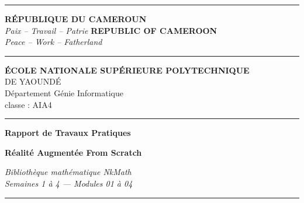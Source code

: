 \documentclass[12pt,a4paper]{report}
\begin{document}
\begin{titlepage}
    \begin{center}
        \vspace*{0.5cm}

        \textcolor{titlecolor}{\rule{\linewidth}{2pt}}
        \vspace{0.3cm}

        {\Large\textbf{RÉPUBLIQUE DU CAMEROUN}\\
        \textit{Paix -- Travail -- Patrie}}
        \hfill
        {\Large\textbf{REPUBLIC OF CAMEROON}\\
        \textit{Peace -- Work -- Fatherland}}

        \vspace{0.5cm}
        \textcolor{titlecolor}{\rule{\linewidth}{1pt}}
        \vspace{0.3cm}

        {\large\textbf{ÉCOLE NATIONALE SUPÉRIEURE POLYTECHNIQUE}\\
        DE YAOUNDÉ}\\
        \vspace{0.1cm}
        {\normalsize Département Génie Informatique}\\
        {\normalsize classe :  AIA4}

        \vspace{0.5cm}
        \textcolor{titlecolor}{\rule{\linewidth}{1pt}}

        \vspace{1.5cm}

        {\Huge\textbf{\textcolor{titlecolor}{
            Rapport de Travaux Pratiques
        }}}

        \vspace{0.5cm}

        {\huge\textbf{\textcolor{accentcolor}{
            Réalité Augmentée From Scratch
        }}}

        \vspace{0.3cm}

        {\Large\textit{
            Bibliothèque mathématique NkMath\\
            Semaines 1 à 4 --- Modules 01 à 04
        }}

        \vspace{1cm}
        \textcolor{titlecolor}{\rule{0.5\linewidth}{1pt}}
        \vspace{1cm}


\end{center}
\end{titlepage}
\end{document}
